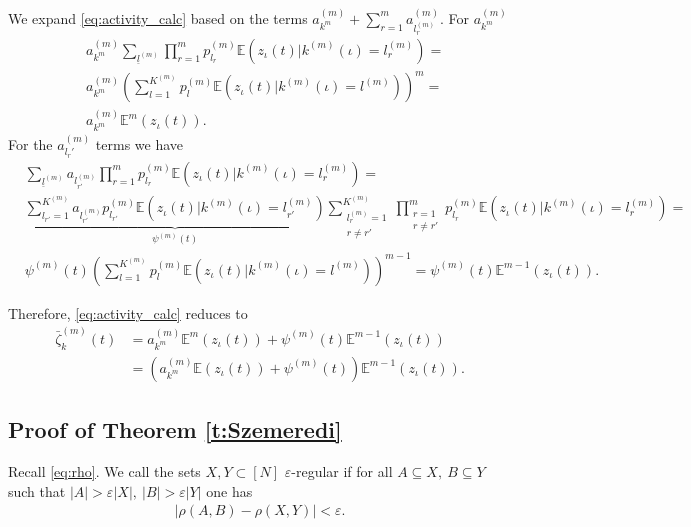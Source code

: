 \documentclass{article}
\newcommand{\E}{\mathbb{E}}
\newcommand{\1}[1]{{\mathds{1}}_{\left\{#1\right\}}}
\begin{document}
	We expand \eqref{eq:activity_calc} based on the terms $a_{k^m}^{(m)}+\sum_{r=1}^{m}a_{l_r^{(m)}}^{(m)}$. For $a_{k^m}^{(m)}$
	\begin{align*}
		&a_{k^m}^{(m)}\sum_{\underline{l}^{(m)}}\prod_{r=1}^{m}p_{l_r}^{(m)}\E \left(\left. z_{\iota}(t) \right| k^{(m)}(\iota)=l_r^{(m)} \right)=\\
		& a_{k^m}^{(m)} \left(\sum_{l=1}^{K^(m)}p_{l}^{(m)}\E \left(\left. z_{\iota}(t) \right| k^{(m)}(\iota)=l^{(m)} \right) \right)^m=\\
		&a_{k^m}^{(m)}\E^{m} \left(z_{\iota}(t)\right) .
	\end{align*}
	For the $a_{l_r'}^{(m)}$ terms we have
	\begin{align*}
		&\sum_{\underline{l}^{(m)}}a_{l_{r'}^{(m)}}\prod_{r=1}^{m}p_{l_r}^{(m)}\E \left(\left. z_{\iota}(t) \right| k^{(m)}(\iota)=l_r^{(m)} \right)=\\
		&\underbrace{\sum_{l_{r'}=1}^{K^{(m)}}a_{l_{r'}^{(m)}}p_{l_{r'}}^{(m)}\E \left(\left. z_{\iota}(t) \right| k^{(m)}(\iota)=l_{r'}^{(m)} \right)}_{\psi^{(m)}(t)}\sum_{\substack{l_r^{(m)}=1 \\  r \neq r'}}^{K^{(m)}}\prod_{\substack{r =1 \\ r \neq r'}}^{m}p_{l_r}^{(m)}\E \left(\left. z_{\iota}(t) \right| k^{(m)}(\iota)=l_r^{(m)} \right)=\\
		& \psi^{(m)}(t) \left( \sum_{l=1}^{K^(m)}p_{l}^{(m)}\E \left(\left. z_{\iota}(t) \right| k^{(m)}(\iota)=l^{(m)} \right) \right)^{m-1}=\psi^{(m)}(t) \E^{m-1} \left(z_{\iota}(t) \right).
	\end{align*}
	
	Therefore, \eqref{eq:activity_calc} reduces to
	\begin{align*}
		\bar{\zeta}^{(m)}_k(t)&=a_{k^m}^{(m)}\E^{m} \left(z_{\iota}(t)\right)+\psi^{(m)}(t) \E^{m-1} \left(z_{\iota}(t) \right)\\
		&=\left(a_{k^m}^{(m)}\E \left(z_{\iota}(t)\right)+\psi^{(m)}(t) \right)\E^{m-1} \left(z_{\iota}(t)\right).
	\end{align*}	
	
	\subsection{Proof of Theorem \ref{t:Szemeredi}}
	
	Recall \eqref{eq:rho}. We call the sets $X,Y \subset [N]$ $\varepsilon$-regular if for all $A \subseteq X, \ B \subseteq Y$ such that $\left|A \right|>\varepsilon \left|X \right|, \ \left| B\right|>\varepsilon \left|Y \right| $ one has
	\begin{align*}
		\left|\rho\left(A,B \right)-\rho \left( X,Y\right) \right|<\varepsilon.
	\end{align*} 
	
\end{document}
